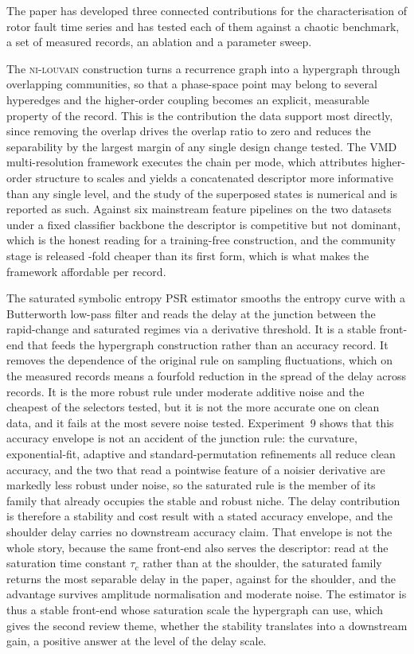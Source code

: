 \documentclass[10pt,a4paper,twocolumn]{article}
\newcommand{\nilouvain}{\textsc{ni-louvain}}
\begin{document}
The paper has developed three connected contributions for the
characterisation of rotor fault time series and has tested each of them
against a chaotic benchmark, a set of measured records, an ablation and a
parameter sweep.

The \nilouvain{} construction turns a recurrence graph into a hypergraph through
overlapping communities, so that a phase-space point may belong to several
hyperedges and the higher-order coupling becomes an explicit, measurable
property of the record.  This is the contribution the data support most
directly, since removing the overlap drives the overlap ratio to zero and
reduces the separability by the largest margin of any single design change
tested.  The VMD multi-resolution framework executes the chain per mode, which
attributes higher-order structure to scales and yields a concatenated descriptor
more informative than any single level, and the study of the superposed states
is numerical and is reported as such.  Against six mainstream feature pipelines
on the two datasets under a fixed classifier backbone the descriptor is
competitive but not dominant, which is the honest reading for a training-free
construction, and the community stage is released \niSpeedup-fold cheaper than
its first form, which is what makes the framework affordable per record.

The saturated symbolic entropy PSR estimator smooths the entropy curve with a
Butterworth low-pass filter and reads the delay at the junction between the
rapid-change and saturated regimes via a derivative threshold.  It is a stable
front-end that feeds the hypergraph construction rather than an accuracy record.
It removes the
dependence of the original rule on sampling fluctuations, which on the measured
records means a fourfold reduction in the spread of the delay across records.
It is the more robust rule under moderate additive noise and the cheapest of the
selectors tested, but it is not the more accurate one on clean data, and it
fails at the most severe noise tested.  Experiment~9 shows that this accuracy
envelope is not an accident of the junction rule: the curvature, exponential-fit,
adaptive and standard-permutation refinements all reduce clean accuracy, and the
two that read a pointwise feature of a noisier derivative are markedly less
robust under noise, so the saturated rule is the member of its family that
already occupies the stable and robust niche.  The delay
contribution is therefore a stability and cost result with a stated accuracy
envelope, and the shoulder delay carries no downstream accuracy claim.  That
envelope is not the whole story, because the same front-end also serves the
descriptor: read at the saturation time constant $\tau_c$ rather than at the
shoulder, the saturated family returns the most separable delay in the paper,
\sepCleanFIT{} against \sepCleanLPF{} for the shoulder, and the advantage
survives amplitude normalisation and moderate noise.  The estimator is thus a
stable front-end whose saturation scale the hypergraph can use, which gives the
second review theme, whether the stability translates into a downstream gain,
a positive answer at the level of the delay scale.
\end{document}
